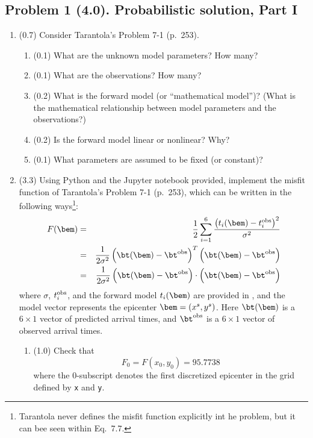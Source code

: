 \documentclass[11pt,titlepage,fleqn]{article}
\begin{document}

\pagebreak
\subsection*{Problem 1 (4.0). Probabilistic solution, Part I}

\begin{enumerate}
\item (0.7) Consider Tarantola's Problem 7-1 (p.~253).
%
\begin{enumerate}
\item (0.1) What are the unknown model parameters? How many?
\item (0.1) What are the observations? How many?
\item (0.2) What is the forward model (or ``mathematical model'')? (What is the mathematical relationship between model parameters and the observations?)
\item (0.2) Is the forward model linear or nonlinear? Why?
\item (0.1) What parameters are assumed to be fixed (or constant)?
\end{enumerate}


\item (3.3) Using Python and the Jupyter notebook provided, implement the misfit function of Tarantola's Problem 7-1 (p.~253), which can be written in the following ways\footnote{Tarantola never defines the misfit function explicitly int he problem, but it can bee seen within Eq.~7.7.}:
%
\begin{eqnarray}
F(\bem) &=& \frac{1}{2} \sum_{i=1}^6 \frac{\left(t_i(\bem) - t_i^{\rm obs}\right)^2}{\sigma^2}
\\
&=& \frac{1}{2\sigma^2} \left(\bt(\bem) - \bt^{\rm obs}\right)^T \left(\bt(\bem) - \bt^{\rm obs}\right)
\\
&=& \frac{1}{2\sigma^2} \left(\bt(\bem) - \bt^{\rm obs}\right) \cdot \left(\bt(\bem) - \bt^{\rm obs}\right)
\end{eqnarray}
%
where $\sigma$, $t_i^{\rm obs}$, and the forward model $t_i(\bem)$ are provided in \citet{Tarantola2005}, and the model vector represents the epicenter $\bem = (x^s,y^s)$. Here $\bt(\bem)$ is a $6 \times 1$ vector of predicted arrival times, and $\bt^{\rm obs}$ is a $6 \times 1$ vector of observed arrival times.

\begin{enumerate}
\item (1.0) Check that
%
\begin{equation*}
F_0 = F(x_0,y_0) = 95.7738
\end{equation*}
%
where the 0-subscript denotes the first discretized epicenter in the grid defined by \verb+x+ and \verb+y+.


\end{enumerate}
\end{enumerate}
\end{document}
